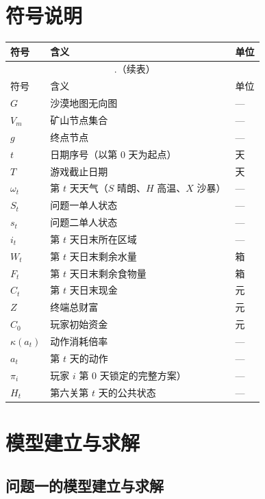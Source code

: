 \documentclass{cumcmthesis}
\numberwithin{equation}{section}
\numberwithin{figure}{section}
\numberwithin{table}{section}
\renewcommand{\thetable}{\arabic{section}.\arabic{table}}
\begin{document}
\section{符号说明}

\begin{longtable}{p{2.5em}>{\centering\arraybackslash}p{\dimexpr\textwidth-5em\relax}p{2em}}

\toprule[1.5pt]
符号 & 含义 & 单位 \\
\midrule[1pt]
\endfirsthead
\multicolumn{3}{c}{\tablename~\thetable{}（续表）} \\
\midrule[1pt]
符号 & 含义 & 单位 \\
\midrule[1pt]
\endhead
\bottomrule[1.5pt]
\endfoot
\bottomrule[1.5pt]
\endlastfoot
$G$ & 沙漠地图无向图 & --- \\
$V_m$ & 矿山节点集合 & --- \\
$g$ & 终点节点 & --- \\
$t$ & 日期序号（以第 0 天为起点） & 天 \\
$T$ & 游戏截止日期 & 天 \\
$\omega_t$ & 第 $t$ 天天气（$S$ 晴朗、$H$ 高温、$X$ 沙暴） & --- \\
$S_t$ & 问题一单人状态 & --- \\
$s_t$ & 问题二单人状态  & --- \\
$i_t$ & 第 $t$ 天日末所在区域 & --- \\
$W_t$ & 第 $t$ 天日末剩余水量 & 箱 \\
$F_t$ & 第 $t$ 天日末剩余食物量 & 箱 \\
$C_t$ & 第 $t$ 天日末现金 & 元 \\
$Z$ & 终端总财富 & 元 \\
$C_0$ & 玩家初始资金 & 元 \\
$\kappa(a_t)$ & 动作消耗倍率 & --- \\
$a_t$ & 第 $t$ 天的动作 & --- \\
$\pi_i$ & 玩家 $i$ 第 0 天锁定的完整方案） & --- \\
$H_t$ & 第六关第 $t$ 天的公共状态 & --- \\
\end{longtable}

\section{模型建立与求解}
\subsection{问题一的模型建立与求解}
\end{document}
